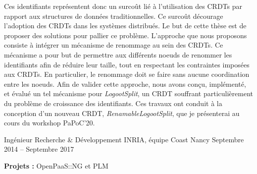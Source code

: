 \documentclass[12pt, a4paper]{awesome-cv}
\begin{document}
\begin{cventries}
\begin{cvparagraph}
  Ces identifiants représentent donc un surcoût lié à l'utilisation des \acp{CRDT} par rapport aux structures de données traditionnelles.
  Ce surcoût décourage l'adoption des \acp{CRDT} dans les systèmes distribués.
  Le but de cette thèse est de proposer des solutions pour pallier ce problème.
  L'approche que nous proposons consiste à intégrer un mécanisme de renommage au sein des \acp{CRDT}.
  Ce mécanisme a pour but de permettre aux différents noeuds de renommer les identifiants afin de réduire leur taille, tout en respectant les contraintes imposées aux \acp{CRDT}.
  En particulier, le renommage doit se faire sans aucune coordination entre les noeuds.
  Afin de valider cette approche, nous avons conçu, implémenté, et évalué un tel mécanisme pour \emph{LogootSplit}, un \ac{CRDT} souffrant particulièrement du problème de croissance des identifiants.
  Ces travaux ont conduit à la conception d'un nouveau \ac{CRDT}, \emph{RenamableLogootSplit}, que je présenterai au cours du workshop PaPoC'20.

  \begin{description}[labelindent=1.6em,itemsep=-0.3em]
    \item {}
    \item {}
  \end{description}
\end{cvparagraph}

\cventry
  {Ingénieur Recherche \& Développement} %
  {INRIA, équipe Coast} %
  {Nancy} %
  {Septembre 2014 – Septembre 2017} %
  {
    \begin{cvitems} %
      \item {\textbf{Projets :} OpenPaaS::NG et PLM}
    \end{cvitems}
  }



\end{cventries}
\end{document}
